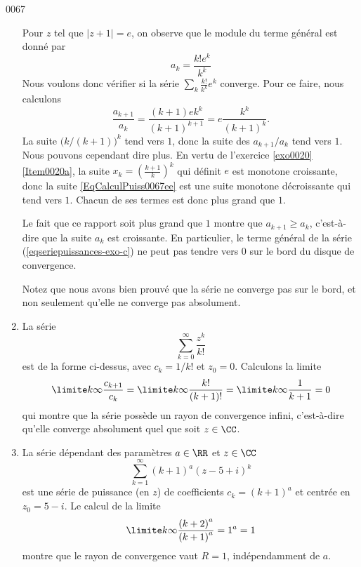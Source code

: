 \begin{corrige}{0067}
\begin{enumerate}
Pour $z$ tel que $| z+1 | = e$, on observe que le module du terme général est donné par
\begin{equation}
a_k = \frac{k! e^k}{k^k}
\end{equation}
Nous voulons donc vérifier si la série $\sum_k\frac{ k! }{ k^k }e^k$ converge. Pour ce faire, nous calculons
\begin{equation}\label{EqCalculPuiss0067ee}
	\frac{a_{k+1}}{a_k}=\frac{ (k+1)ek^k }{ (k+1)^{k+1} }=e\frac{ k^k }{ (k+1)^k }.
\end{equation}
La suite $\big( k/(k+1) \big)^k$ tend vers $1$, donc la suite des $a_{k+1}/a_k$ tend vers $1$. Nous pouvons cependant dire plus. En vertu de l'exercice \ref{exo0020}\ref{Item0020a}, la suite $x_k=\left( \frac{ k+1 }{ k } \right)^k$ qui définit $e$ est monotone croissante, donc la suite \eqref{EqCalculPuiss0067ee} est une suite monotone décroissante qui tend vers $1$. Chacun de ses termes est donc plus grand que $1$.


Le fait que ce rapport soit plus grand que $1$ montre que $a_{k+1} \geq a_k$, c'est-à-dire que la suite $a_k$ est croissante. En particulier, le terme général de la série (\ref{eqseriepuissances-exo-c}) ne peut pas tendre vers $0$ sur le bord du disque de convergence.

Notez que nous avons bien prouvé que la série ne converge pas sur le bord, et non seulement qu'elle ne converge pas absolument.

\item 
La série
\begin{equation*}
	\sum_{k=0}^\infty \frac{z^k}{k!}
\end{equation*}
est de la forme ci-dessus, avec $c_k = 1/k!$ et $z_0 = 0$. Calculons la limite
\begin{equation*}
\limite k \infty \frac{c_{k+1}}{c_k} = \limite k\infty
\frac{k!}{(k+1)!} = \limite k\infty \frac{1}{k+1} = 0
\end{equation*}
qui montre que la série possède un rayon de convergence infini,
c'est-à-dire qu'elle converge absolument quel que soit $z \in \CC$.

\item La série dépendant des paramètres $a \in \RR$ et $z \in \CC$
\begin{equation*}
\sum_{k=1}^\infty {(k+1)}^a {(z- 5 + i)}^k
\end{equation*}
est une série de puissance (en $z$) de coefficients $c_k =
{(k+1)}^a$ et centrée en $z_0 = 5 - i$. Le calcul de la limite
\begin{equation*}
\limite k\infty \frac{{(k+2)}^a}{{(k+1)}^a} = 1^a = 1
\end{equation*}
montre que le rayon de convergence vaut $R = 1$, indépendamment de
$a$.


\end{enumerate}
\end{corrige}

